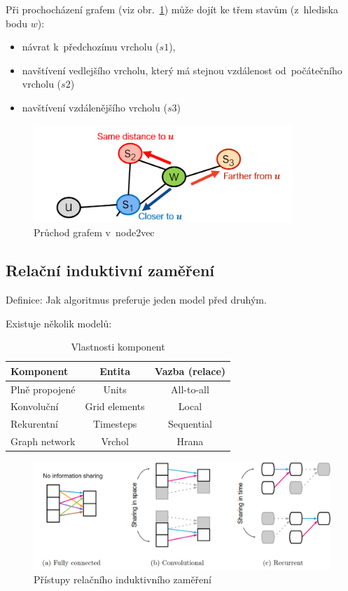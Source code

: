 Při prochocházení grafem (viz obr.~\ref{pruchod-node2vec}) může dojít ke třem stavům (z~hlediska bodu $w$):
\begin{itemize}
	\item návrat k~předchozímu vrcholu ($s1$),
	\item navštívení vedlejšího vrcholu, který má stejnou vzdálenost od~počátečního vrcholu ($s2$)
	\item navštívení vzdálenějšího vrcholu ($s3$)
\end{itemize}

\begin{figure}
    \centering
	\includegraphics[height=10em]{images/node2vec.png}
    \caption{Průchod grafem v~node2vec}
    \label{pruchod-node2vec}
\end{figure}

\subsection{Relační induktivní zaměření}

Definice: Jak algoritmus preferuje jeden model před druhým. 

Existuje několik modelů:
\begin{table}[ht]
\centering
\caption{Vlastnosti komponent}
\begin{tabular}{|l|c|c|}
\hline
Komponent & Entita & Vazba (relace) \\ \hline \hline
Plně propojené & Units & All-to-all \\ \hline
Konvoluční & Grid elements & Local \\ \hline
Rekurentní & Timesteps & Sequential \\ \hline
Graph network & Vrchol & Hrana \\ \hline
\end{tabular}
\end{table}

\begin{figure}[ht]
    \centering
	\includegraphics[width=\textwidth]{images/11_RIB}
    \caption{Přístupy relačního induktivního zaměření}
\end{figure}

